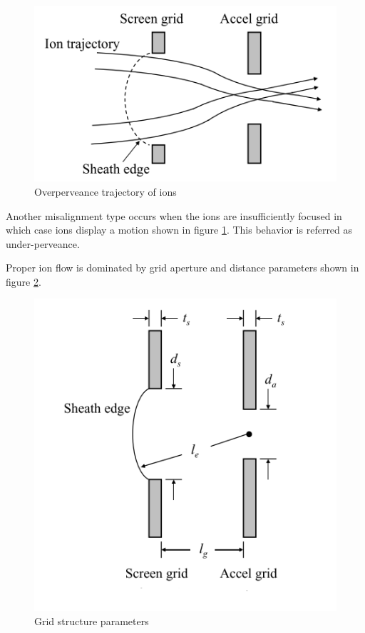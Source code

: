 \begin{figure}[ht]
    \centering
    \includegraphics[scale=0.6]{fig/underperveance.png}
    \caption[Under-perveance trajectory of ions]{Overperveance trajectory of ions\cite{williams2013ion}}
    \label{fig:underperveance}
\end{figure}


Another misalignment type occurs when the ions are insufficiently focused in which case ions display a motion shown in figure \ref{fig:underperveance}. This behavior is referred as under-perveance. 

Proper ion flow is dominated by grid aperture and distance parameters shown in figure \ref{fig:gridparams}.
\newpage
\begin{figure}[ht]
    \centering
    \includegraphics[scale=0.6]{fig/gridparameters.png}
    \caption[Grid structure parameters]{Grid structure parameters\cite{williams2013ion}}
    \label{fig:gridparams}
\end{figure}

